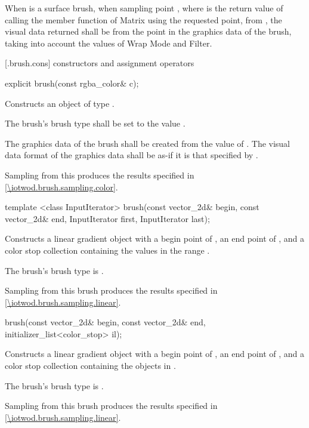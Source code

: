 \pnum
When  is a surface brush, when sampling point , where  is the return value of calling the  member function of Matrix using the requested point, from , the visual data returned shall be from the point  in the graphics data of the brush, taking into account the values of Wrap Mode and Filter.

 [\iotwod.brush.cons] { constructors and assignment operators}

\begin{itemdecl}
explicit brush(const rgba_color& c);
\end{itemdecl}
\begin{itemdescr}
\pnum
\effects
Constructs an object of type .

\pnum
The brush's brush type shall be set to the value .

\pnum
The graphics data of the brush shall be created from the value of . The visual data format of the graphics data shall be as-if it is that specified by .

\pnum
\remarks
Sampling from this produces the results specified in \ref{\iotwod.brush.sampling.color}.
\end{itemdescr}

\begin{itemdecl}
template <class InputIterator>
brush(const vector_2d& begin, const vector_2d& end,
  InputIterator first, InputIterator last);
\end{itemdecl}
\begin{itemdescr}
\pnum
\effects
Constructs a linear gradient  object with a begin point of , an end point of , and a color stop collection containing the values in the range .

\pnum
The brush's brush type is .

\pnum
\remarks
Sampling from this brush produces the results specified in \ref{\iotwod.brush.sampling.linear}.
\end{itemdescr}

\begin{itemdecl}
brush(const vector_2d& begin, const vector_2d& end,
  initializer_list<color_stop> il);
\end{itemdecl}
\begin{itemdescr}
\pnum
\effects
Constructs a linear gradient  object with a begin point of , an end point of , and a color stop collection containing the  objects in .

\pnum
The brush's brush type is .

\pnum
\remarks
Sampling from this brush produces the results specified in \ref{\iotwod.brush.sampling.linear}.
\end{itemdescr}

